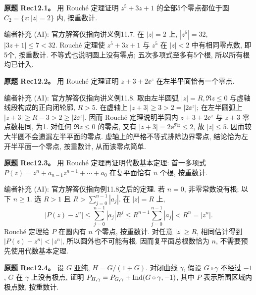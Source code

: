 \begin{exercise}
\textbf{原题 Rec12.1。}\label{ass:rec12-1}
用 Rouch\'e 定理证明 $z^5+3z+1$ 的全部5个零点都位于圆 $C_2=\{z:|z|=2\}$ 内, 按重数计.
\end{exercise}
\begin{solution}
编者补充 (AI): 官方解答仅指向讲义例11.7. 在 $|z|=2$ 上, $|z^5|=32$, $|3z+1|\le7<32$. Rouch\'e 定理使 $z^5+3z+1$ 与 $z^5$ 在 $|z|<2$ 中有相同零点数, 即5个, 按重数计. 不等式也说明圆上没有零点; 五次多项式至多有5个根, 所以所有根均已计入.
\end{solution}
\begin{exercise}
\textbf{原题 Rec12.2。}\label{ass:rec12-2}
用 Rouch\'e 定理证明 $z+3+2\ee^z$ 在左半平面恰有一个零点.
\end{exercise}
\begin{solution}
编者补充 (AI): 官方解答仅指向讲义例11.8. 取由左半圆弧 $|z|=R,\Re z\le0$ 与虚轴线段构成的正向闭轮廓, $R>5$. 在虚轴上 $|z+3|\ge3>2=|2\ee^z|$; 在左半圆弧上 $|z+3|\ge R-3>2\ge|2\ee^z|$. 因而 Rouch\'e 定理说明半圆内 $z+3+2\ee^z$ 与 $z+3$ 零点数相同, 为1. 对任何 $\Re z\le0$ 的零点, 又有 $|z+3|=2\ee^{\Re z}\le2$, 故 $|z|\le5$. 因而较大半圆不会遗漏左半平面的零点. 虚轴上的严格不等式排除边界零点, 结论恰为左开半平面一个零点, 按重数计, 从而该零点简单.
\end{solution}
\begin{exercise}
\textbf{原题 Rec12.3。}\label{ass:rec12-3}
用 Rouch\'e 定理再证明代数基本定理: 首一多项式 $P(z)=z^n+a_{n-1}z^{n-1}+\cdots+a_0$ 在复平面恰有 $n$ 个根, 按重数计.
\end{exercise}
\begin{solution}
编者补充 (AI): 官方解答仅指向例11.8之后的定理. 若 $n=0$, 非零常数没有根; 以下 $n\ge1$. 选 $R>1$ 且 $R>\sum_{j=0}^{n-1}|a_j|$. 在 $|z|=R$ 上,
\[
|P(z)-z^n|\le\sum_{j=0}^{n-1}|a_j|R^j
\le R^{n-1}\sum_{j=0}^{n-1}|a_j|<R^n=|z^n|.
\]
Rouch\'e 定理给 $P$ 在圆内有 $n$ 个零点, 按重数计. 对任意 $|z|\ge R$, 相同估计得到 $|P(z)-z^n|<|z^n|$, 所以圆外也不可能有根. 因而复平面总根数恰为 $n$, 不需要预先使用代数基本定理.
\end{solution}
\begin{exercise}
\textbf{原题 Rec12.4。}\label{ass:rec12-4}
设 $G$ 亚纯, $H=G/(1+G)$. 对闭曲线 $\gamma$, 假设 $G\circ\gamma$ 不经过 $-1$, $G$ 在 $\gamma$ 上没有极点, 证明 $P_{H,\gamma}=P_{G,\gamma}+\operatorname{Ind}(G\circ\gamma,-1)$, 其中 $P$ 表示所围区域内极点数, 按重数计.
\end{exercise}
